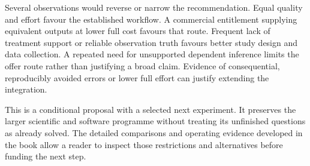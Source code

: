 Several observations would reverse or narrow the recommendation. Equal
quality and effort favour the established workflow. A commercial
entitlement supplying equivalent outputs at lower full cost favours
that route. Frequent lack of treatment support or reliable observation
truth favours better study design and data collection. A repeated
need for unsupported dependent inference limits the offer route rather
than justifying a broad claim. Evidence of consequential, reproducibly
avoided errors or lower full effort can justify extending the integration.

This is a conditional proposal with a selected next experiment. It
preserves the larger scientific and software programme without treating
its unfinished questions as already solved. The detailed comparisons
and operating evidence developed in the book allow a reader to inspect those
restrictions and alternatives before funding the next step.



\backmatter
\clearpage{}
{}




